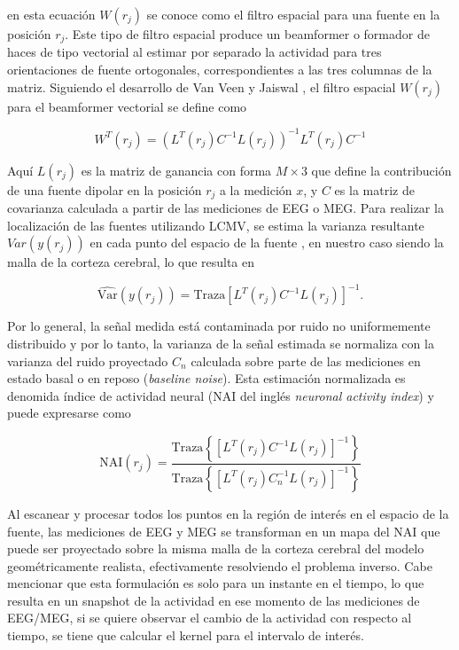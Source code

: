 en esta ecuación $W(r_j)$ se conoce como el filtro espacial para una fuente en la posición $r_j$. Este tipo de filtro espacial produce un beamformer o formador de haces de tipo vectorial al estimar por separado la actividad para tres orientaciones de fuente ortogonales, correspondientes a las tres columnas de la matriz. Siguiendo el desarrollo de Van Veen y Jaiswal \cite{VanVeen1997,Jaiswal2020}, el filtro espacial $W(r_j)$ para el beamformer vectorial se define como

\begin{equation}
	\label{beamformer2}
W^{T}(r_j) = (L^{T}(r_j)C^{-1}L(r_j))^{-1}L^{T}(r_j)C^{-1}
\end{equation}

Aquí $L(r_j)$ es la matriz de ganancia con forma $M \times 3$ que define la contribución de una fuente dipolar en la posición $r_j$ a la medición $x$, y $C$ es la matriz de covarianza calculada a partir de las mediciones de EEG o MEG. Para realizar la localización de las fuentes utilizando LCMV, se estima la varianza resultante $Var(y(r_j))$ en cada punto del espacio de la fuente \cite{VanVeen1997,Jaiswal2020}, en nuestro caso siendo la malla de la corteza cerebral, lo que resulta en

\begin{equation}
	\label{beamformer3}
\widehat{\text{Var}}(y(r_j)) = \text{Traza}[L^{T}(r_j)C^{-1}L(r_j)]^{-1}.
\end{equation}

Por lo general, la señal medida está contaminada por ruido no uniformemente distribuido y por lo tanto, la varianza de la señal estimada se normaliza con la varianza del ruido proyectado $C_n$ calculada sobre parte de las mediciones en estado basal o en reposo (\emph{baseline noise}). Esta estimación normalizada es denomida índice de actividad neural (NAI del inglés \emph{neuronal activity index}) \cite{VanVeen1997} y puede expresarse como

\begin{equation}
	\label{beamformer4}
\text{NAI}(r_j) = \frac{\text{Traza}\left\{[L^{T}(r_j)C^{-1}L(r_j)]^{-1}\right\}}{\text{Traza}\left\{[L^{T}(r_j)C_n^{-1}L(r_j)]^{-1}\right\}}
\end{equation}

Al escanear y procesar todos los puntos en la región de interés en el espacio de la fuente, las mediciones de EEG y MEG se transforman en un mapa del NAI que puede ser proyectado sobre la misma malla de la corteza cerebral del modelo geométricamente realista, efectivamente resolviendo el problema inverso. Cabe mencionar que esta formulación es solo para un instante en el tiempo, lo que resulta en un snapshot de la actividad en ese momento de las mediciones de EEG/MEG, si se quiere observar el cambio de la actividad con respecto al tiempo, se tiene que calcular el kernel para el intervalo de interés.

